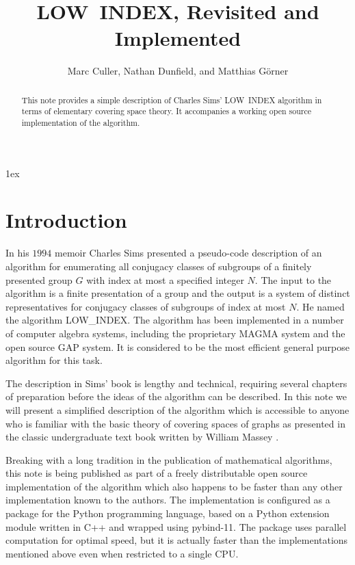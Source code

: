 \documentclass[12pt]{article}
\theoremstyle{definition}
\begin{document}
\normalfont
\title{LOW~INDEX, Revisited and Implemented}
\author{Marc Culler, Nathan Dunfield, and Matthias G\"orner}
\maketitle
\begin{abstract}\noindent
  This note provides a simple description of Charles Sims' LOW~INDEX
  algorithm in terms of elementary covering space theory.  It
  accompanies a working open source implementation of the algorithm.
\end{abstract}
\parindent 0pt 
\parskip 1ex 
\section{Introduction}

In his $1994$ memoir \cite[Chapter 5]{Sims} Charles Sims presented a pseudo-code
description of an algorithm for enumerating all conjugacy classes of subgroups
of a finitely presented group $G$ with index at most a specified integer $N$.
The input to the algorithm is a finite presentation of a group and the output is
a system of distinct representatives for conjugacy classes of subgroups of index
at most $N$.  He named the algorithm LOW\_INDEX.  The algorithm has been
implemented in a number of computer algebra systems, including the proprietary
MAGMA system and the open source GAP system.  It is considered to be the most
efficient general purpose algorithm for this task.

The description in Sims' book is lengthy and technical, requiring several
chapters of preparation before the ideas of the algorithm can be described.  In
this note we will present a simplified description of the algorithm which is
accessible to anyone who is familiar with the basic theory of covering spaces of
graphs as presented in the classic undergraduate text book written by William
Massey \cite{Massey}.

Breaking with a long tradition in the publication of mathematical algorithms,
this note is being published as part of a freely distributable open source
implementation of the algorithm which also happens to be faster than any other
implementation known to the authors.  The implementation is configured as a
package for the Python programming language, based on a Python extension module
written in C++ and wrapped using pybind-11.  The package uses parallel
computation for optimal speed, but it is actually faster than the
implementations mentioned above even when restricted to a single CPU.
\end{document}
